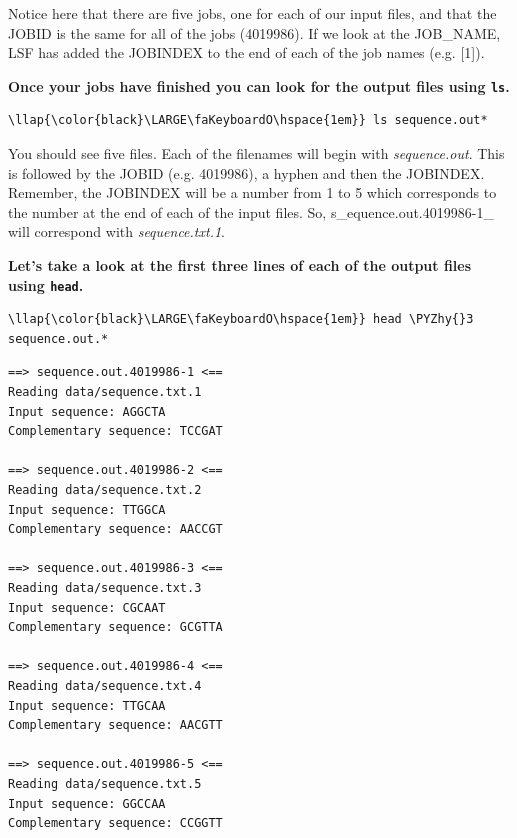 \documentclass[11pt]{article}
\def\PYZhy{\char`\-}
\begin{document}
    Notice here that there are five jobs, one for each of our input files,
and that the JOBID is the same for all of the jobs (4019986). If we look
at the JOB\_NAME, LSF has added the JOBINDEX to the end of each of the
job names (e.g. {[}1{]}).

\textbf{Once your jobs have finished you can look for the output files
using \texttt{ls}.}

\begin{terminalinput}
\begin{Verbatim}[commandchars=\\\{\}]
\llap{\color{black}\LARGE\faKeyboardO\hspace{1em}} ls sequence.out*
\end{Verbatim}
\end{terminalinput}


    You should see five files. Each of the filenames will begin with
\textit{sequence.out}. This is followed by the JOBID (e.g. 4019986), a
hyphen and then the JOBINDEX. Remember, the JOBINDEX will be a number
from 1 to 5 which corresponds to the number at the end of each of the
input files. So, s\_equence.out.4019986-1\_ will correspond with
\textit{sequence.txt.1}.

\textbf{Let's take a look at the first three lines of each of the output
files using \texttt{head}.}

\begin{terminalinput}
\begin{Verbatim}[commandchars=\\\{\}]
\llap{\color{black}\LARGE\faKeyboardO\hspace{1em}} head \PYZhy{}3 sequence.out.*
\end{Verbatim}
\end{terminalinput}


    \begin{verbatim}
==> sequence.out.4019986-1 <==
Reading data/sequence.txt.1
Input sequence: AGGCTA
Complementary sequence: TCCGAT

==> sequence.out.4019986-2 <==
Reading data/sequence.txt.2
Input sequence: TTGGCA
Complementary sequence: AACCGT

==> sequence.out.4019986-3 <==
Reading data/sequence.txt.3
Input sequence: CGCAAT
Complementary sequence: GCGTTA

==> sequence.out.4019986-4 <==
Reading data/sequence.txt.4
Input sequence: TTGCAA
Complementary sequence: AACGTT

==> sequence.out.4019986-5 <==
Reading data/sequence.txt.5
Input sequence: GGCCAA
Complementary sequence: CCGGTT
\end{verbatim}
\end{document}

